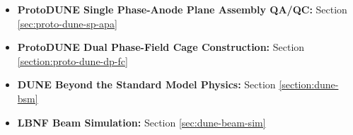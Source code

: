 \begin{itemize}

\item{\textbf{ProtoDUNE Single Phase-Anode Plane Assembly QA/QC:}} Section \ref{sec:proto-dune-sp-apa}

\item {{\bf ProtoDUNE Dual Phase-Field Cage Construction:}} Section \ref{section:proto-dune-dp-fc}

\item {\textbf{DUNE Beyond the Standard Model Physics:}} Section \ref{section:dune-bsm}

\item {\textbf{LBNF Beam Simulation:}} Section \ref{sec:dune-beam-sim}



\end{itemize}


